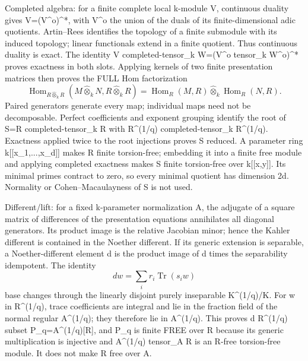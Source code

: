 \documentclass[11pt]{article}
\begin{document}
Completed algebra: for a finite complete local k-module V, continuous duality gives V=(V\textasciicircum{}o)\textasciicircum{}*, with V\textasciicircum{}o the union of the duals of its finite-dimensional adic quotients. Artin--Rees identifies the topology of a finite submodule with its induced topology; linear functionals extend in a finite quotient. Thus continuous duality is exact. The identity V completed-tensor\_k W=(V\textasciicircum{}o tensor\_k W\textasciicircum{}o)\textasciicircum{}* proves exactness in both slots. Applying kernels of two finite presentation matrices then proves the FULL Hom factorization
\[
 \operatorname{Hom}_{R\widehat\otimes_k R}(M\widehat\otimes_k N,R\widehat\otimes_k R)
 =\operatorname{Hom}_R(M,R)\widehat\otimes_k\operatorname{Hom}_R(N,R).
\]
Paired generators generate every map; individual maps need not be decomposable. Perfect coefficients and exponent grouping identify the root of S=R completed-tensor\_k R with R\textasciicircum{}(1/q) completed-tensor\_k R\textasciicircum{}(1/q). Exactness applied twice to the root injections proves S reduced. A parameter ring k[[x\_1,...,x\_d]] makes R finite torsion-free; embedding it into a finite free module and applying completed exactness makes S finite torsion-free over k[[x,y]]. Its minimal primes contract to zero, so every minimal quotient has dimension 2d. Normality or Cohen--Macaulayness of S is not used.

Different/lift: for a fixed k-parameter normalization A, the adjugate of a square matrix of differences of the presentation equations annihilates all diagonal generators. Its product image is the relative Jacobian minor; hence the Kahler different is contained in the Noether different. If its generic extension is separable, a Noether-different element d is the product image of d times the separability idempotent. The identity
\[
 dw=\sum_i r_i\operatorname{Tr}(s_iw)
\]
base changes through the linearly disjoint purely inseparable K\textasciicircum{}(1/q)/K. For w in R\textasciicircum{}(1/q), trace coefficients are integral and lie in the fraction field of the normal regular A\textasciicircum{}(1/q); they therefore lie in A\textasciicircum{}(1/q). This proves d R\textasciicircum{}(1/q) subset P\_q=A\textasciicircum{}(1/q)[R], and P\_q is finite FREE over R because its generic multiplication is injective and A\textasciicircum{}(1/q) tensor\_A R is an R-free torsion-free module. It does not make R free over A.
\end{document}
